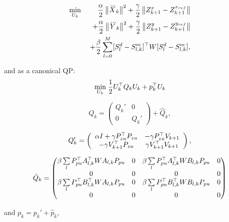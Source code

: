 \begin{eqnarray*}
\nonumber
 \min_{U_k} \; && \dfrac{\alpha}{2} \left\| \dddot{X}_k \right\|^2
 + \dfrac{\gamma}{2} \left\| Z_{k+1}^x - Z_{k+1}^{x_{ref}} \right\| \\
 \nonumber
 && + \dfrac{\alpha}{2} \left\| \dddot{Y}_k \right\|^2
 + \dfrac{\gamma}{2} \left\| Z_{k+1}^y - Z_{k+1}^{y_{ref}} \right\| \\
 \nonumber
 && + \dfrac{\beta}{2} \sum\limits_{l=0}^{M}  [S^d_{l}- S^m_{l,k}]^{\top} W [S^d_{l} - S^m_{l,k}],
\end{eqnarray*}

and as a canonical QP:
\begin{equation*}
\underset{U_k}{\min} \; \dfrac{1}{2} U_k^{\top} Q_k U_k + p_k^{\top} U_k
\end{equation*}

\begin{equation*}
Q_k = \left( \begin{array}{cc}
Q_k' & 0 \\
0 & Q_k'
\end{array}
 \right) + \hat{Q}_k,
\end{equation*}

\begin{equation*}
 Q_k' = \left(
 \begin{array}{cc}
 \alpha I + \gamma P^{\top}_{zu}P_{zu} & - \gamma P^{\top}_{zu}V_{k+1} \\
 -\gamma V^{\top}_{k+1} P_{zu} & \gamma V^{\top}_{k+1} V_{k+1}
 \end{array}
 \right),
\end{equation*}

\begin{equation*}
 \hat{Q}_k = \left(
 \begin{matrix}
 \beta \sum\limits_l P_{pu}^{\top} A_{l,k}^{\top} {W} A_{l,k} P_{pu} & 0 & \beta \sum\limits_l P_{pu}^{\top} A_{l,k}^{\top} {W} B_{l,k} P_{pu} & 0\\
 0 & 0 & 0 & 0 \\
 \beta \sum\limits_l P_{pu}^{\top} B_{l,k}^{\top} {W} A_{l,k} P_{pu} & 0 & \beta \sum\limits_l P_{pu}^{\top} B_{l,k}^{\top} {W} B_{l,k} P_{pu} & 0 \\
 0 & 0 & 0 & 0
 \end{matrix}
 \right)
\end{equation*}

and $p_k = p_k' + \hat{p}_k$,

